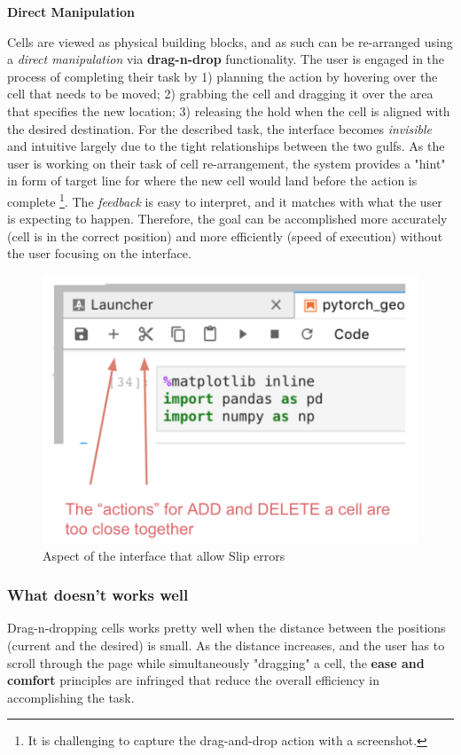 \documentclass[12pt,letterpaper]{article}
\begin{document}
\textbf{Direct Manipulation}

Cells are viewed as physical building blocks, and as such can be re-arranged using a \textit{direct manipulation} via \textbf{drag-n-drop} functionality. The user is engaged in the process of completing their task by 1) planning the action by hovering over the cell that needs to be moved; 2) grabbing the cell and dragging it over the area that specifies the new location; 3) releasing the hold when the cell is aligned with the desired destination. For the described task, the interface becomes \textit{invisible} and intuitive largely due to the tight relationships between the two gulfs. As the user is working on their task of cell re-arrangement, the system provides a "hint" in form of target line for where the new cell would land before the action is complete \footnote{It is challenging to capture the drag-and-drop action with a screenshot.}. The \textit{feedback} is easy to interpret, and it matches with what the user is expecting to happen. Therefore, the goal can be accomplished more accurately (cell is in the correct position) and more efficiently (speed of execution) without the user focusing on the interface.

\begin{figure}[h]
\centering
\includegraphics[scale=.4]{figures/project-principles/jupyter_add_delete.png}
\caption{Aspect of the interface that allow Slip errors}
\label{fig::2}
\end{figure}


\subsubsection*{What doesn't works well}
Drag-n-dropping cells works pretty well when the distance between the positions (current and the desired) is small. As the distance increases, and the user has to scroll through the page while simultaneously "dragging" a cell, the \textbf{ease and comfort} principles are infringed that reduce the overall efficiency in accomplishing the task. 
\end{document}
